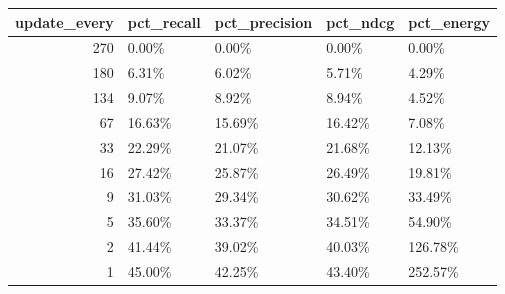 \begin{tabular}{rllll}
\toprule
update_every & pct_recall & pct_precision & pct_ndcg & pct_energy \\
\midrule
270 & 0.00\% & 0.00\% & 0.00\% & 0.00\% \\
180 & 6.31\% & 6.02\% & 5.71\% & 4.29\% \\
134 & 9.07\% & 8.92\% & 8.94\% & 4.52\% \\
67 & 16.63\% & 15.69\% & 16.42\% & 7.08\% \\
33 & 22.29\% & 21.07\% & 21.68\% & 12.13\% \\
16 & 27.42\% & 25.87\% & 26.49\% & 19.81\% \\
9 & 31.03\% & 29.34\% & 30.62\% & 33.49\% \\
5 & 35.60\% & 33.37\% & 34.51\% & 54.90\% \\
2 & 41.44\% & 39.02\% & 40.03\% & 126.78\% \\
1 & 45.00\% & 42.25\% & 43.40\% & 252.57\% \\
\bottomrule
\end{tabular}
